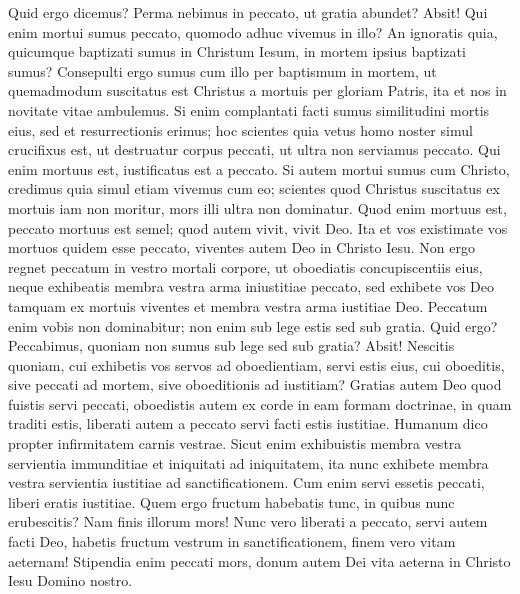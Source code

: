 \begin{biblechapter}
\begin{biblechapter}
\begin{biblechapter}
\begin{biblechapter}
\begin{biblechapter}
\begin{biblechapter}
\verse Quid ergo dicemus? Perma nebimus in peccato, ut gratia abundet?
 \verse Absit! Qui enim mortui sumus peccato, quomodo adhuc vivemus in illo? 
\verse An ignoratis quia, quicumque baptizati sumus in Christum Iesum, in mortem ipsius baptizati sumus? 
\verse Consepulti ergo sumus cum illo per baptismum in mortem, ut quemadmodum suscitatus est Christus a mortuis per gloriam Patris, ita et nos in novitate vitae ambulemus. 
\verse Si enim complantati facti sumus similitudini mortis eius, sed et resurrectionis erimus; 
\verse hoc scientes quia vetus homo noster simul crucifixus est, ut destruatur corpus peccati, ut ultra non serviamus peccato. 
\verse Qui enim mortuus est, iustificatus est a peccato.
 \verse Si autem mortui sumus cum Christo, credimus quia simul etiam vivemus cum eo; 
 \verse scientes quod Christus suscitatus ex mortuis iam non moritur, mors illi ultra non dominatur. 
\verse Quod enim mortuus est, peccato mortuus est semel; quod autem vivit, vivit Deo. 
\verse Ita et vos existimate vos mortuos quidem esse peccato, viventes autem Deo in Christo Iesu.
 \verse Non ergo regnet peccatum in vestro mortali corpore, ut oboediatis concupiscentiis eius, 
\verse neque exhibeatis membra vestra arma iniustitiae peccato, sed exhibete vos Deo tamquam ex mortuis viventes et membra vestra arma iustitiae Deo. 
\verse Peccatum enim vobis non dominabitur; non enim sub lege estis sed sub gratia.
 \verse Quid ergo? Peccabimus, quoniam non sumus sub lege sed sub gratia? Absit! 
 \verse Nescitis quoniam, cui exhibetis vos servos ad oboedientiam, servi estis eius, cui oboeditis, sive peccati ad mortem, sive oboeditionis ad iustitiam? 
\verse Gratias autem Deo quod fuistis servi peccati, oboedistis autem ex corde in eam formam doctrinae, in quam traditi estis, 
\verse liberati autem a peccato servi facti estis iustitiae.
 \verse Humanum dico propter infirmitatem carnis vestrae. Sicut enim exhibuistis membra vestra servientia immunditiae et iniquitati ad iniquitatem, ita nunc exhibete membra vestra servientia iustitiae ad sanctificationem. 
\verse Cum enim servi essetis peccati, liberi eratis iustitiae. 
\verse Quem ergo fructum habebatis tunc, in quibus nunc erubescitis? Nam finis illorum mors! 
\verse Nunc vero liberati a peccato, servi autem facti Deo, habetis fructum vestrum in sanctificationem, finem vero vitam aeternam! 
\verse Stipendia enim peccati mors, donum autem Dei vita aeterna in Christo Iesu Domino nostro.
 

\end{biblechapter}
\end{biblechapter}
\end{biblechapter}
\end{biblechapter}
\end{biblechapter}
\end{biblechapter}
